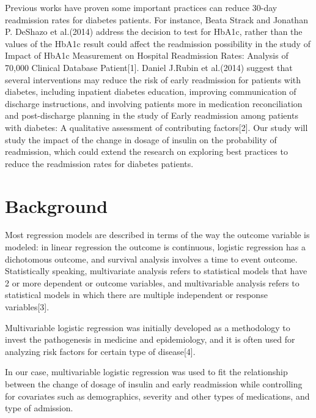 \documentclass[twoside,11pt]{article}
\begin{document}
Previous works have proven some important practices can reduce 30-day readmission rates for diabetes patients. For instance, Beata Strack and Jonathan P. DeShazo et al.(2014) address the decision to test for HbA1c, rather than the values of the HbA1c result could affect the readmission possibility in the study of Impact of HbA1c Measurement on Hospital Readmission Rates: Analysis of 70,000 Clinical Database Patient[1]. Daniel J.Rubin et al.(2014) suggest that several interventions may reduce the risk of early readmission for patients with diabetes, including inpatient diabetes education, improving communication of discharge instructions, and involving patients more in medication reconciliation and post-discharge planning in the study of Early readmission among patients with diabetes: A qualitative assessment of contributing factors[2].
Our study will study the impact of the change in dosage of insulin on the probability of readmission, which could extend the research on exploring best practices to reduce the readmission rates for diabetes patients. 


\section{Background} \label{background}
Most regression models are described in terms of the way the outcome variable is modeled: in linear regression the outcome is continuous, logistic regression has a dichotomous outcome, and survival analysis involves a time to event outcome. Statistically speaking, multivariate analysis refers to statistical models that have 2 or more dependent or outcome variables, and multivariable analysis refers to statistical models in which there are multiple independent or response variables[3].

Multivariable logistic regression was initially developed as a methodology to invest the pathogenesis in medicine and epidemiology, and it is often used for analyzing risk factors for certain type of disease[4].

In our case, multivariable logistic regression was used to fit the relationship between the change of dosage of insulin and early readmission while controlling for covariates such as demographics, severity and other types of medications, and type of admission. 
\end{document}
